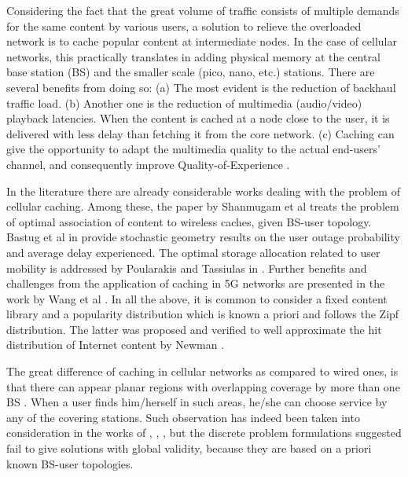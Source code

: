 \documentclass[conference,twocolum,final]{IEEEtran}
\begin{document}
Considering the fact that the great volume of traffic consists of multiple demands for the same content by various users, a solution to relieve the overloaded network is to cache popular content at intermediate nodes. In the case of cellular networks, this practically translates in adding physical memory at the central base station (BS) and the smaller scale (pico, nano, etc.) stations. There are several benefits from doing so: (a) The most evident is the reduction of backhaul traffic load. (b) Another one is the reduction of multimedia (audio/video) playback latencies. When the content is cached at a node close to the user, it is delivered with less delay than fetching it from the core network. (c) Caching can give the opportunity to adapt the multimedia quality to the actual end-users' channel, and consequently improve Quality-of-Experience \cite{PoularINFOCOM14}.

In the literature there are already considerable works dealing with the problem of cellular caching. Among these, the paper by  Shanmugam et al \cite{DimakisCaireCacheIT} treats the problem of optimal association of content to wireless caches, given BS-user topology. Bastug et al in \cite{BastugCacheISWCS14} provide stochastic geometry results on the user outage probability and average delay experienced. The optimal storage allocation related to user mobility is addressed by Poularakis and Tassiulas in \cite{PoularISIT13}. Further benefits and challenges from the application of caching in 5G networks are presented in the work by Wang et al \cite{Wang5Gcache}. In all the above, it is common to consider a fixed content library and a popularity distribution which is known a priori and follows the Zipf distribution. The latter was proposed and verified to well approximate the hit distribution of Internet content by Newman \cite{Newman05}.

The great difference of caching in cellular networks as compared to wired ones, is that there can appear planar regions with overlapping coverage by more than one BS \cite{KeelerBartek13}. When a user finds him/herself in such areas, he/she can choose service by any of the covering stations. Such observation has indeed been taken into consideration in the works of \cite{DimakisCaireCacheIT}, \cite{PoularINFOCOM14}, \cite{PoularISIT13}, but the discrete problem formulations suggested fail to give solutions with global validity, because they are based on a priori known BS-user topologies. 
\end{document}
